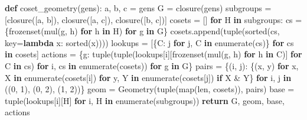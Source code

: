 \documentclass[
  10pt,
  letterpaper,
]{article}
\newenvironment{Shaded}{}{}
\newcommand{\BuiltInTok}[1]{\textcolor[rgb]{0.00,0.50,0.00}{#1}}
\newcommand{\ControlFlowTok}[1]{\textcolor[rgb]{0.00,0.44,0.13}{\textbf{#1}}}
\newcommand{\DecValTok}[1]{\textcolor[rgb]{0.25,0.63,0.44}{#1}}
\newcommand{\KeywordTok}[1]{\textcolor[rgb]{0.00,0.44,0.13}{\textbf{#1}}}
\newcommand{\NormalTok}[1]{#1}
\newcommand{\OperatorTok}[1]{\textcolor[rgb]{0.40,0.40,0.40}{#1}}
\begin{document}
\begin{Shaded}
\begin{Highlighting}[]
\KeywordTok{def}\NormalTok{ coset\_geometry(gens):}
\NormalTok{    a, b, c }\OperatorTok{=}\NormalTok{ gens}
\NormalTok{    G }\OperatorTok{=}\NormalTok{ closure(gens)}
\NormalTok{    subgroups }\OperatorTok{=}\NormalTok{ [closure([a, b]), closure([a, c]), closure([b, c])]}
\NormalTok{    cosets }\OperatorTok{=}\NormalTok{ []}
    \ControlFlowTok{for}\NormalTok{ H }\KeywordTok{in}\NormalTok{ subgroups:}
\NormalTok{        cs }\OperatorTok{=}\NormalTok{ \{}\BuiltInTok{frozenset}\NormalTok{(mul(g, h) }\ControlFlowTok{for}\NormalTok{ h }\KeywordTok{in}\NormalTok{ H) }\ControlFlowTok{for}\NormalTok{ g }\KeywordTok{in}\NormalTok{ G\}}
\NormalTok{        cosets.append(}\BuiltInTok{tuple}\NormalTok{(}\BuiltInTok{sorted}\NormalTok{(cs, key}\OperatorTok{=}\KeywordTok{lambda}\NormalTok{ x: }\BuiltInTok{sorted}\NormalTok{(x))))}
\NormalTok{    lookups }\OperatorTok{=}\NormalTok{ [\{C: j }\ControlFlowTok{for}\NormalTok{ j, C }\KeywordTok{in} \BuiltInTok{enumerate}\NormalTok{(cs)\} }\ControlFlowTok{for}\NormalTok{ cs }\KeywordTok{in}\NormalTok{ cosets]}
\NormalTok{    actions }\OperatorTok{=}\NormalTok{ \{g: }\BuiltInTok{tuple}\NormalTok{(}\BuiltInTok{tuple}\NormalTok{(lookups[i][}\BuiltInTok{frozenset}\NormalTok{(mul(g, h) }\ControlFlowTok{for}\NormalTok{ h }\KeywordTok{in}\NormalTok{ C)]}
                             \ControlFlowTok{for}\NormalTok{ C }\KeywordTok{in}\NormalTok{ cs) }\ControlFlowTok{for}\NormalTok{ i, cs }\KeywordTok{in} \BuiltInTok{enumerate}\NormalTok{(cosets)) }\ControlFlowTok{for}\NormalTok{ g }\KeywordTok{in}\NormalTok{ G\}}
\NormalTok{    pairs }\OperatorTok{=}\NormalTok{ \{(i, j): \{(x, y) }\ControlFlowTok{for}\NormalTok{ x, X }\KeywordTok{in} \BuiltInTok{enumerate}\NormalTok{(cosets[i]) }\ControlFlowTok{for}\NormalTok{ y, Y }\KeywordTok{in} \BuiltInTok{enumerate}\NormalTok{(cosets[j]) }\ControlFlowTok{if}\NormalTok{ X }\OperatorTok{\&}\NormalTok{ Y\}}
             \ControlFlowTok{for}\NormalTok{ i, j }\KeywordTok{in}\NormalTok{ ((}\DecValTok{0}\NormalTok{, }\DecValTok{1}\NormalTok{), (}\DecValTok{0}\NormalTok{, }\DecValTok{2}\NormalTok{), (}\DecValTok{1}\NormalTok{, }\DecValTok{2}\NormalTok{))\}}
\NormalTok{    geom }\OperatorTok{=}\NormalTok{ Geometry(}\BuiltInTok{tuple}\NormalTok{(}\BuiltInTok{map}\NormalTok{(}\BuiltInTok{len}\NormalTok{, cosets)), pairs)}
\NormalTok{    base }\OperatorTok{=} \BuiltInTok{tuple}\NormalTok{(lookups[i][H] }\ControlFlowTok{for}\NormalTok{ i, H }\KeywordTok{in} \BuiltInTok{enumerate}\NormalTok{(subgroups))}
    \ControlFlowTok{return}\NormalTok{ G, geom, base, actions}



\end{Highlighting}
\end{Shaded}
\end{document}
